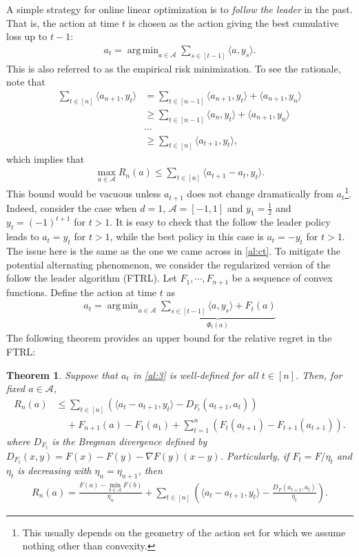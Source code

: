 \documentclass[10pt,a4article]{amsart}
\numberwithin{equation}{section}
\theoremstyle{plain}
\newtheorem{Th}{Theorem}
\theoremstyle{definition}
\DeclareMathOperator*{\argmin}{arg\,min}
\begin{document}
A simple strategy for online linear optimization is to \emph{follow the leader} in the past. That is, the action at time $t$ is chosen as the action giving the best cumulative loss up to $t-1$: 
\begin{align*}
a_{t}=\argmin_{a\in\mathcal A}\sum_{s\in [t-1]}\langle a, y_s\rangle.
\end{align*}
This is also referred to as the empirical risk minimization. To see the rationale, note that
\begin{align*}
\sum_{t\in [n]}\langle a_{n+1}, y_t\rangle&=\sum_{t\in [n-1]}\langle a_{n+1}, y_t\rangle+\langle a_{n+1}, y_n\rangle\\
&\geq \sum_{t\in [n-1]}\langle a_{n}, y_t\rangle+\langle a_{n+1}, y_n\rangle\\
&\cdots\\
&\geq \sum_{t\in [n]}\langle a_{t+1}, y_t\rangle,
\end{align*}
which implies that
\begin{align*}
\max_{a\in\mathcal A}R_{n}(a)\leq\sum_{t\in [n]}\langle a_{t+1}-a_t, y_t\rangle.
\end{align*}
This bound would be vacuous unless $a_{t+1}$ does not change dramatically from $a_t$\footnote{This usually depends on the geometry of the action set for which we assume nothing other than convexity.}. Indeed, consider the case when $d=1$, $\mathcal A = [-1,1]$ and $y_1=\frac{1}{2}$ and $y_t = (-1)^{t+1}$ for $t> 1$. It is easy to check that the follow the leader policy leads to $a_t = y_t$ for $t>1$, while the best policy in this case is $a_t = -y_t$ for $t>1$. The issue here is the same as the one we came across in \eqref{al:ct}. To mitigate the potential alternating phenomenon, we consider the regularized version of the follow the leader algorithm (FTRL). Let $F_1, \cdots, F_{n+1}$ be a sequence of convex functions. Define the action at time $t$ as 
\begin{align}
a_t=\argmin_{a\in\mathcal A}\underbrace{\sum_{s\in [t-1]}\langle a, y_s\rangle+F_t(a)}_{\Phi_t(a)}\label{al:3}
\end{align}  
The following theorem provides an upper bound for the relative regret in the FTRL:
\begin{Th}\label{al:FTRL}
Suppose that $a_t$ in \eqref{al:3} is well-defined for all $t\in [n]$. Then, for fixed $a\in\mathcal A$,  
\begin{align*}
R_n(a)&\leq \sum_{t\in [n]}\left(\langle a_t-a_{t+1},y_t\rangle-D_{F_t}(a_{t+1}, a_t)\right)\\
&\ \ \ \ \ +F_{n+1}(a)-F_1(a_1)+\sum_{t=1}^n\left(F_t(a_{t+1})-F_{t+1}(a_{t+1})\right).
\end{align*}
where $D_{F_t}$ is the Bregman divergence defined by $D_{F_t}(x,y)=F(x)-F(y)-\nabla F(y)(x-y)$. Particularly, if $F_t = F/\eta_t$ and $\eta_t$ is decreasing with $\eta_n=\eta_{n+1}$, then
\begin{align*}
R_n(a)=\frac{F(a)-\min_{b\in\mathcal A}F(b)}{\eta_n}+\sum_{t\in [n]}\left(\langle a_t- a_{t+1}, y_t\rangle-\frac{D_F(a_{t+1}, a_t)}{\eta_t}\right).
\end{align*}
\end{Th}
\end{document}
